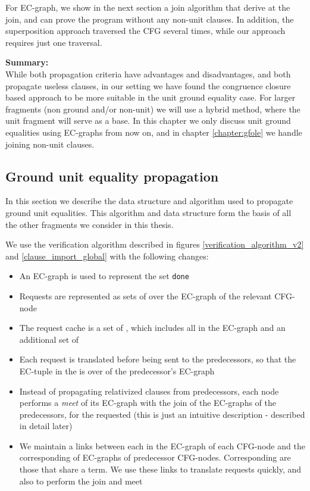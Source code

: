 \bigskip
\noindent
For EC-graph, we show in the next section a join algorithm that derive  at the join, 
and can prove the program without any non-unit clauses. 
In addition, the superposition approach traversed the CFG several times, while our approach requires just one traversal.


\bigskip
\noindent
\textbf{Summary:}\\
While both propagation criteria have advantages and disadvantages, and both propagate useless clauses, in our setting we have found the congruence closure based approach to be more suitable in the unit ground equality case.
For larger fragments (non ground and/or non-unit) we will use a hybrid method, where the unit fragment will serve as a base.
In this chapter we only discuss unit ground equalities using EC-graphs from now on, and in chapter \ref{chapter:gfole} we handle joining non-unit clauses.

\subsection{Ground unit equality propagation}
In this section we describe the data structure and algorithm used to propagate ground unit equalities.
This algorithm and data structure form the basis of all the other fragments we consider in this thesis.


\bigskip
\noindent
We use the verification algorithm described in figures \ref{verification_algorithm_v2} and \ref{clause_import_global} with the following changes:
\begin{itemize}
\item An EC-graph is used to represent the set \lstinline|done|
\item Requests are represented as sets of \GFAs{} over the EC-graph of the relevant CFG-node
\item The request cache is a set of \GFAs{}, which includes all \GFAs{} in the EC-graph and an additional set of \GFAs{}
\item Each request is translated before being sent to the predecessors, so that the EC-tuple in the \GFA{} is over \GTs{} of the predecessor's EC-graph
\item Instead of propagating relativized clauses from predecessors, each node performs a \emph{meet} of its EC-graph with the join of the EC-graphs of the predecessors, for the requested \GFAs{} (this is just an intuitive description - described in detail later)
\item We maintain a links between each \GT{} in the EC-graph of each CFG-node and the corresponding \GTs{} of EC-graphs of predecessor CFG-nodes. Corresponding \GTs{} are those that share a term. We use these links to translate requests quickly, and also to perform the join and meet
\end{itemize}

